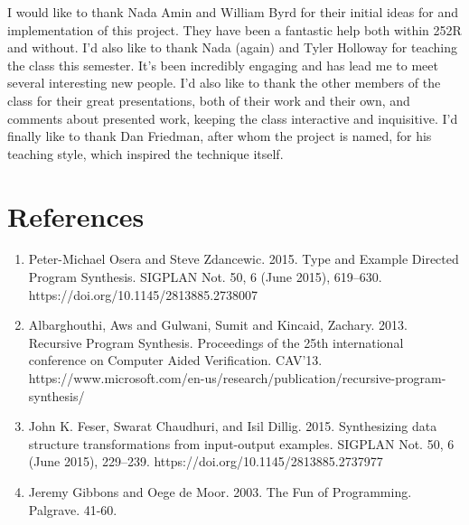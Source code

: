 \documentclass[acmsmall,screen]{acmart}
\begin{document}
\begin{acks}
    I would like to thank Nada Amin and William Byrd for their initial ideas for and implementation of this project. They have been a fantastic help both within 252R and without. I'd also like to thank Nada (again) and Tyler Holloway for teaching the class this semester. It's been incredibly engaging and has lead me to meet several interesting new people. I'd also like to thank the other members of the class for their great presentations, both of their work and their own, and comments about presented work, keeping the class interactive and inquisitive. I'd finally like to thank Dan Friedman, after whom the project is named, for his teaching style, which inspired the technique itself.
\end{acks}

\section*{References}

\begin{enumerate}
  \item Peter-Michael Osera and Steve Zdancewic. 2015. Type and Example Directed Program Synthesis. SIGPLAN Not. 50, 6 (June 2015), 619–630. https://doi.org/10.1145/2813885.2738007
  \item Albarghouthi, Aws and Gulwani, Sumit and Kincaid, Zachary. 2013. Recursive Program Synthesis. Proceedings of the 25th international conference on Computer Aided Verification. CAV'13. https://www.microsoft.com/en-us/research/publication/recursive-program-synthesis/
  \item John K. Feser, Swarat Chaudhuri, and Isil Dillig. 2015. Synthesizing data structure transformations from input-output examples. SIGPLAN Not. 50, 6 (June 2015), 229–239. https://doi.org/10.1145/2813885.2737977
  \item Jeremy Gibbons and Oege de Moor. 2003. The Fun of Programming. Palgrave. 41-60.
\end{enumerate}
\end{document}

